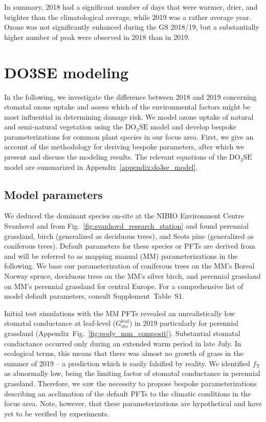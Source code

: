 \documentclass[bg, manuscript]{copernicus}
\begin{document}
In summary, 2018 had a significant number of days that were warmer, drier, and brighter than the climatological average, while 2019 was a rather average year. Ozone was not significantly enhanced during the GS 2018/19, but a substantially higher number of peak \chem{[O_3]} were observed in 2018 than in 2019.

\section{DO3SE modeling}
\label{sec:do3se}
In the following, we investigate the difference between 2018 and 2019 concerning stomatal ozone uptake and assess which of the environmental factors might be most influential in determining  damage risk. We model ozone uptake of natural and semi-natural vegetation using the $\mathrm{DO_3SE}$ model \citep{ACP:Bueker2012} and develop bespoke parameterizations for common plant species in our focus area. First, we give an account of the methodology for deriving bespoke parameters, after which we present and discuss the modeling results. The relevant equations of the $\mathrm{DO_3SE}$ model are summarized in Appendix~\ref{appendix:do3se_model}.

\subsection{Model parameters}
\label{subsec:do3se_parameters}

We deduced the dominant species on-site at the NIBIO Environment Centre Svanhovd and from Fig.~\ref{fig:svanhovd_research_station} and found perennial grassland, birch (generalized as deciduous trees), and Scots pine (generalized as coniferous trees). Default parameters for these species or PFTs are derived from \citet{EP:Simpson2007,GCB:Mills2011,ICP:MappingManual2017} and will be referred to as mapping manual (MM) parameterizations in the following. We base our parameterization of coniferous trees on the MM's Boreal Norway spruce, deciduous trees on the MM's silver birch, and perennial grassland on MM's perennial grassland for central Europe. For a comprehensive list of model default parameters, consult Supplement~Table~S1.

Initial test simulations with the MM PFTs revealed an unrealistically low stomatal conductance at leaf-level ($G_\mathrm{sto}^\mathrm{leaf}$) in 2019 particularly for perennial grassland (Appendix~Fig.~\ref{fig:pody_mm_composit}). Substantial stomatal conductance occurred only during an extended warm period in late July. In ecological terms, this means that there was almost no growth of grass in the summer of 2019 -- a prediction which is easily falsified by reality. We identified $f_\mathrm{T}$ as abnormally low, being the limiting factor of stomatal conductance in perennial grassland. Therefore, we saw the necessity to propose bespoke parameterizations describing an acclimation of the default PFTs to the climatic conditions in the focus area. Note, however, that these parameterizations are hypothetical and have yet to be verified by experiments. 
\end{document}
